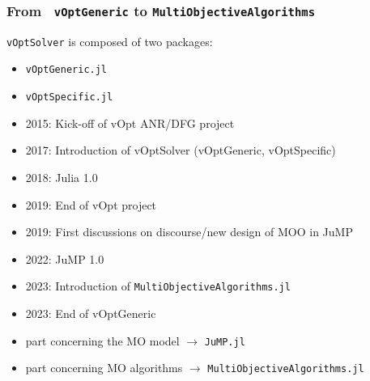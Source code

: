 \documentclass[]{beamer}
\newcommand{\grisc}[1]{\color{black!20}#1}
\begin{document}
\begin{frame}
  \frametitle{From \ \texttt{vOptGeneric} to  { \texttt{MultiObjectiveAlgorithms}}}
\vspace{3mm}

 \texttt{vOptSolver}  is composed of two packages:\vspace{-1.25mm}

 {\small
\begin{itemize}  
\item \texttt{vOptGeneric.jl} \vspace{-2mm}
\item \texttt{vOptSpecific.jl}
\end{itemize}
}
\vspace{1.5mm}
\pause

 {\small
\begin{itemize}
    \item[] \hspace{-3mm}2015: {\grisc Kick-off of vOpt ANR/DFG project}\vspace{-1.25mm}\\
    \item[] \hspace{-3mm}2017: {\grisc Introduction of vOptSolver (vOptGeneric, vOptSpecific)}\vspace{-1.25mm}\\
    \item[] \hspace{-3mm}2018: Julia 1.0\vspace{-1.25mm}\\
    \item[] \hspace{-3mm}2019: End of vOpt project   \vspace{-1.25mm}\\
    \item[] \hspace{-3mm}2019: First discussions on discourse/new design of MOO in JuMP\vspace{-1.25mm}\\
    \item[] \hspace{-3mm}2022: JuMP 1.0\vspace{-1.25mm}\\
    \item[] \hspace{-3mm}2023: Introduction of \texttt{MultiObjectiveAlgorithms.jl}\vspace{-1.25mm}\\
    \item[] \hspace{-3mm}2023: End of vOptGeneric
\end{itemize}
}
\vspace{1.5mm}

 {\small
\begin{itemize}
    \item part concerning the MO model $\rightarrow$ \texttt{JuMP.jl}\vspace{-2mm}
    \item part concerning MO algorithms $\rightarrow$ \texttt{MultiObjectiveAlgorithms.jl}
\end{itemize}    
}
\end{frame}
\end{document}
